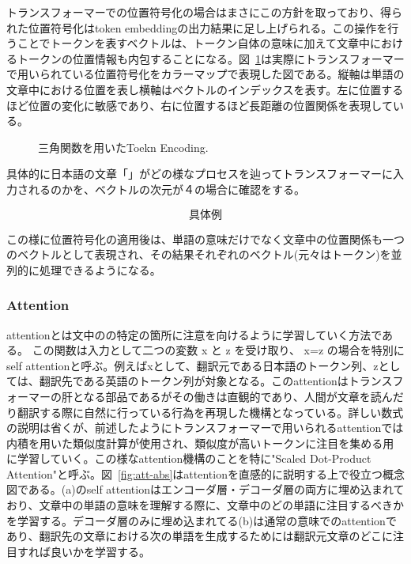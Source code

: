 トランスフォーマーでの位置符号化の場合はまさにこの方針を取っており、得られた位置符号化はtoken embeddingの出力結果に足し上げられる。この操作を行うことでトークンを表すベクトルは、トークン自体の意味に加えて文章中におけるトークンの位置情報も内包することになる。図~\ref{fig:tri-pos-encoding}は実際にトランスフォーマーで用いられている位置符号化をカラーマップで表現した図である。縦軸は単語の文章中における位置を表し横軸はベクトルのインデックスを表す。左に位置するほど位置の変化に敏感であり、右に位置するほど長距離の位置関係を表現している。
\begin{figure}
  \centering

  \caption{三角関数を用いたToekn Encoding.}
\label{fig:tri-pos-encoding}
\end{figure}

具体的に日本語の文章「」がどの様なプロセスを辿ってトランスフォーマーに入力されるのかを、ベクトルの次元が４の場合に確認をする。


\begin{equation*}
  \text{具体例}
\end{equation*}

この様に位置符号化の適用後は、単語の意味だけでなく文章中の位置関係も一つのベクトルとして表現され、その結果それぞれのベクトル(元々はトークン)を並列的に処理できるようになる。


\subsubsection{Attention}
attentionとは文中のの特定の箇所に注意を向けるように学習していく方法である。 この関数は入力として二つの変数 x と z を受け取り、 x=z の場合を特別にself attentionと呼ぶ。例えばxとして、翻訳元である日本語のトークン列、zとしては、翻訳先である英語のトークン列が対象となる。このattentionはトランスフォーマーの肝となる部品であるがその働きは直観的であり、人間が文章を読んだり翻訳する際に自然に行っている行為を再現した機構となっている。詳しい数式の説明は省くが、前述したようにトランスフォーマーで用いられるattentionでは内積を用いた類似度計算が使用され、類似度が高いトークンに注目を集める用に学習していく。この様なattention機構のことを特に"Scaled Dot-Product Attention"と呼ぶ。図~\ref{fig:att-abs}はattentionを直感的に説明する上で役立つ概念図である。(a)のself attentionはエンコーダ層・デコーダ層の両方に埋め込まれており、文章中の単語の意味を理解する際に、文章中のどの単語に注目するべきかを学習する。デコーダ層のみに埋め込まれてる(b)は通常の意味でのattentionであり、翻訳先の文章における次の単語を生成するためには翻訳元文章のどこに注目すれば良いかを学習する。


